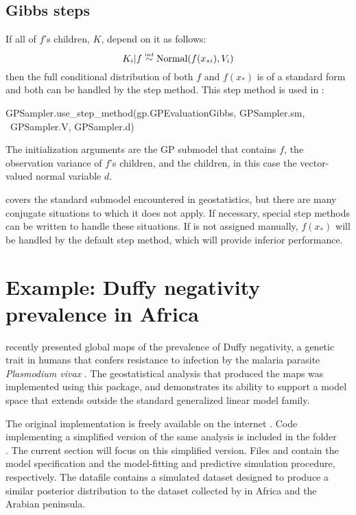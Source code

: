 \documentclass[article]{jss}
\begin{document}
\subsection{Gibbs steps} 
\label{sec:gp-gibbs} 
If all of $f$'s children, $K$, depend on it as follows:
\begin{equation}
    \label{eq:gibbs-criterion} 
    K_i|f \stackrel{\textup{\tiny ind}}{\sim} \textup{Normal}(f(x_{*i}),V_i)
\end{equation}
then the full conditional distribution of both $f$ and $f(x_*)$ is of a standard form and both can be handled by the  step method. This step method is used in :
\begin{CodeChunk}
\begin{CodeInput}
GPSampler.use_step_method(gp.GPEvaluationGibbs, GPSampler.sm, \
    GPSampler.V, GPSampler.d)
\end{CodeInput}
\end{CodeChunk}
The initialization arguments are the GP submodel that contains $f$, the observation variance of $f$'s children, and the children, in this case the vector-valued normal variable $d$. 

 covers the standard submodel encountered in geostatistics, but there are many conjugate situations to which it does not apply. If necessary, special step methods can be written to handle these situations. If  is not assigned manually, $f(x_*)$ will be handled by the default  step method, which will provide inferior performance. 


\section{Example: Duffy negativity prevalence in Africa}
\label{sec:duffy} 

\cite{Howes} recently presented global maps of the prevalence of Duffy negativity, a genetic trait in humans that confers resistance to infection by the malaria parasite \emph{Plasmodium vivax} \citep{duffy-vivax}. The geostatistical analysis that produced the maps was implemented using this package, and demonstrates its ability to support a model space that extends outside the standard generalized linear model family. 

The original implementation is freely available on the internet \citep{duffy-code, generic-mbg}. Code implementing a simplified version of the same analysis is included in the folder \\. The current section will focus on this simplified version. Files  and  contain the model specification and the model-fitting and predictive simulation procedure, respectively. The datafile  contains a simulated dataset designed to produce a similar posterior distribution to the dataset collected by \cite{Howes} in Africa and the Arabian peninsula. 
\end{document}
